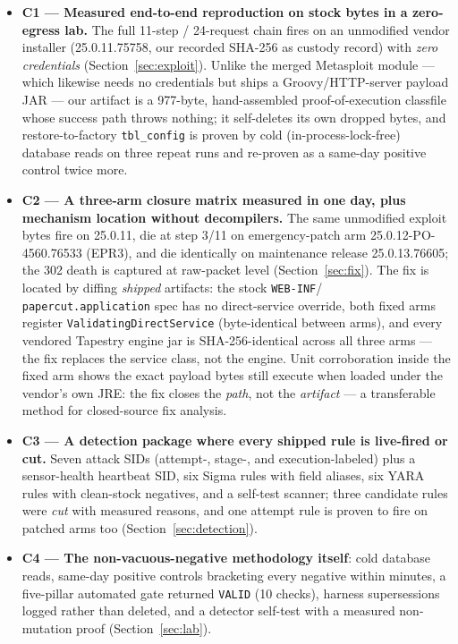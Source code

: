 \documentclass[journal]{IEEEtran}
\begin{document}
\begin{itemize}
\item \textbf{C1 — Measured end-to-end reproduction on stock bytes in a
zero-egress lab.} The full 11-step / 24-request chain fires on an unmodified
vendor installer (25.0.11.75758, our recorded SHA-256 as custody record) with
\emph{zero credentials} (Section~\ref{sec:exploit}). Unlike the merged
Metasploit module — which likewise needs no credentials but ships a
Groovy/HTTP-server payload JAR — our artifact is a 977-byte, hand-assembled
proof-of-execution classfile whose success path throws nothing; it self-deletes its own
dropped bytes, and restore-to-factory \texttt{tbl\_config} is proven by cold
(in-process-lock-free) database reads on three repeat runs and re-proven as a
same-day positive control twice more.
\item \textbf{C2 — A three-arm closure matrix measured in one day, plus
mechanism location without decompilers.} The same unmodified exploit bytes fire
on 25.0.11, die at step 3/11 on emergency-patch arm 25.0.12-PO-4560.76533
(EPR3), and die identically on maintenance release 25.0.13.76605; the 302 death
is captured at raw-packet level (Section~\ref{sec:fix}). The fix is located by
diffing \emph{shipped} artifacts: the stock \texttt{WEB-INF}\slash
\texttt{papercut.application} spec has no direct-service override, both fixed
arms register \texttt{ValidatingDirectService} (byte-identical between arms),
and every vendored Tapestry engine jar is SHA-256-identical across all three
arms — the fix replaces the service class, not the engine. Unit corroboration
inside the fixed arm shows the exact payload bytes still execute when loaded
under the vendor's own JRE: the fix closes the \emph{path}, not the
\emph{artifact} — a transferable method for closed-source fix analysis.
\item \textbf{C3 — A detection package where every shipped rule is live-fired
or cut.} Seven attack SIDs (attempt-, stage-, and execution-labeled) plus a
sensor-health heartbeat SID, six Sigma rules with field aliases, six YARA rules
with clean-stock negatives, and a self-test scanner; three candidate rules were
\emph{cut} with measured reasons, and one attempt rule is proven to fire on
patched arms too (Section~\ref{sec:detection}).
\item \textbf{C4 — The non-vacuous-negative methodology itself}: cold database
reads, same-day positive controls bracketing every negative within minutes, a
five-pillar automated gate returned \texttt{VALID} (10 checks), harness
supersessions logged rather than deleted, and a detector self-test with a
measured non-mutation proof (Section~\ref{sec:lab}).
\end{itemize}
\end{document}
